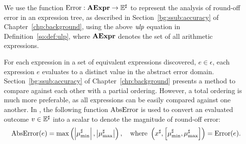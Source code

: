 We use the function $\operatorname{\mathrm{Error}}: \mathbf{AExpr}\to\mathbb{E}^\sharp$ to represent the
analysis of round-off error in an expression tree, as described in
Section~\ref{bg:ssub:accuracy} of Chapter~\ref{chp:background}, using the above
$\operatorname{\mathit{ulp}}$ equation in Definition~\ref{so:def:ulp}, where $\mathbf{AExpr}$ denotes the
set of all arithmetic expressions.

For each expression in a set of equivalent expressions discovered, $e \in
\epsilon$, each expression $e$ evaluates to a distinct value in the abstract
error domain.  Section~\ref{bg:ssub:accuracy} of Chapter~\ref{chp:background}
presents a method to compare against each other with a partial ordering.
However, a total ordering is much more preferable, as all expressions can
be easily compared against one another.  In \soap, the following function
$\operatorname{\mathrm{AbsError}}$ is used to convert an evaluated outcome $v \in \mathbb{E}^\sharp$ into a
scalar to denote the magnitude of round-off error:
\begin{equation}
    \operatorname{\mathrm{AbsError}}(e) = \max\left(
        \left| \mu^\sharp_{\min} \right|,
        \left| \mu^\sharp_{\max} \right|
    \right),
    \quad \text{where~}
    \left(
        x^\sharp, \left[ \mu^\sharp_{\min}, \mu^\sharp_{\max} \right]
    \right) = \operatorname{\mathrm{Error}}(e).
    \label{so:eq:abserr}
\end{equation}
